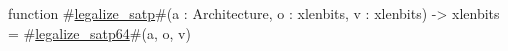 function #\hyperref[sailRISCVzlegalizzezysatp]{legalize\_satp}#(a : Architecture, o : xlenbits, v : xlenbits) -> xlenbits =
  #\hyperref[sailRISCVzlegalizzezysatp64]{legalize\_satp64}#(a, o, v)
